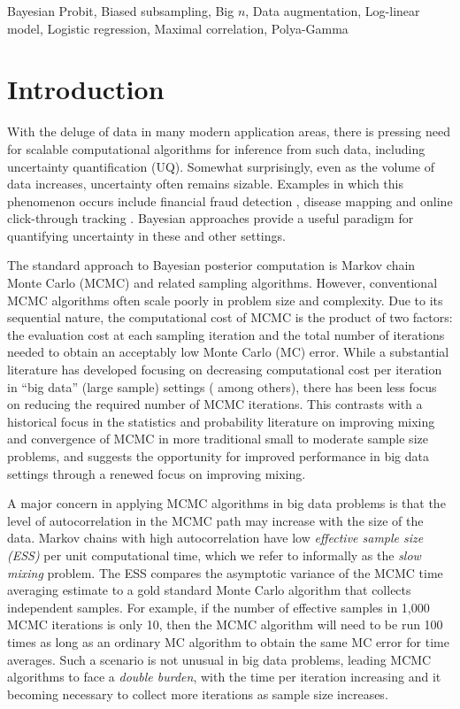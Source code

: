 \documentclass[twoside,11pt]{article}
\newcommand{\1}{\mathbf 1}
\begin{document}
\begin{keywords}
       Bayesian Probit, Biased subsampling, Big $n$, Data augmentation, Log-linear model, Logistic regression, Maximal correlation, Polya-Gamma
\end{keywords}


\newpage

\section{Introduction}

With the deluge of data in many modern application areas, there is pressing need for scalable computational algorithms for inference from such data, including uncertainty quantification (UQ).  Somewhat surprisingly, even as the volume of data increases, uncertainty often remains sizable.  Examples in which this phenomenon occurs include financial fraud detection \citep{ngai2011application}, disease mapping \citep{wakefield2007disease} and online click-through tracking \citep{wang2010click}.  Bayesian approaches provide a useful paradigm for quantifying uncertainty in these and other settings.

The standard approach to Bayesian posterior computation is Markov chain Monte Carlo (MCMC) and related sampling algorithms. However, conventional MCMC algorithms often scale poorly in problem size and complexity. Due to its sequential nature, the computational cost of MCMC is the product of two factors: the evaluation cost at each sampling iteration and the total number of iterations needed to obtain an acceptably low Monte Carlo (MC) error. While a substantial literature has developed focusing on decreasing computational cost per iteration in ``big data'' (large sample) settings (\cite{minsker2014robust,maclaurin2014firefly,
srivastava2015wasp,conrad2015accelerating} among others), there has been less focus on reducing the required number of MCMC iterations. This contrasts with a historical focus in the statistics and probability literature on improving mixing and convergence of MCMC in more traditional small to moderate sample size problems, and suggests the opportunity for improved performance in big data settings through a renewed focus on improving mixing.

{A major concern in applying MCMC algorithms in big data problems is that the level of autocorrelation in the MCMC path may increase with the size of the data.  Markov chains with high autocorrelation 
have low {\em effective sample size (ESS)} per unit computational time, {which we refer to informally as the {\em slow mixing} problem}.  The ESS compares the asymptotic variance of the MCMC time averaging estimate to a gold standard Monte Carlo algorithm that collects independent samples.  For example, if the number of effective samples in 1,000 MCMC iterations is only 10, then the MCMC algorithm will need to be run 100 times as long as an ordinary MC algorithm to obtain the same MC error for time averages. Such a scenario is not unusual in big data problems, leading MCMC algorithms to face a {\em double burden}, with the time per iteration increasing and it becoming necessary to collect more iterations as sample size increases.} 
\end{document}
